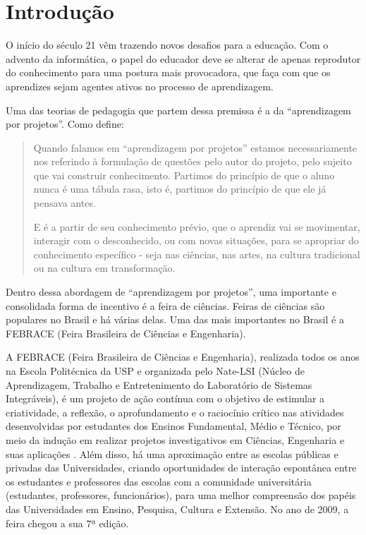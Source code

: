
\chapter{Introdução}

O início do século 21 vêm trazendo novos desafios para a educação. Com o advento da informática, o papel do educador deve se alterar de apenas reprodutor do conhecimento para uma postura mais provocadora, que faça com que os aprendizes sejam agentes ativos no processo de aprendizagem. 

Uma das teorias de pedagogia que partem dessa premissa é a da “aprendizagem por projetos”. Como \cite{fagundes99} define:

\begin{quotation}
    Quando falamos em “aprendizagem por projetos” estamos necessariamente nos referindo à formulação de questões pelo autor do projeto, pelo sujeito que vai construir conhecimento. Partimos do princípio de que o aluno nunca é uma tábula rasa, isto é, partimos do princípio de que ele já pensava antes.

    E é a partir de seu conhecimento prévio, que o aprendiz vai se movimentar, interagir com o desconhecido, ou com novas situações, para se apropriar do conhecimento específico - seja nas ciências, nas artes, na cultura tradicional ou na cultura em transformação.
\end{quotation}

Dentro dessa abordagem de “aprendizagem por projetos”, uma importante e consolidada forma de incentivo é a feira de ciências. Feiras de ciências são populares no Brasil e há várias delas. Uma das mais importantes no Brasil é a FEBRACE (Feira Brasileira de Ciências e Engenharia).

A FEBRACE (Feira Brasileira de Ciências e Engenharia), realizada todos os anos na Escola Politécnica da USP e organizada pelo Nate-LSI (Núcleo de Aprendizagem, Trabalho e Entretenimento do Laboratório de Sistemas Integráveis), é um projeto de ação contínua com o objetivo de estimular a criatividade, a reflexão, o aprofundamento e o raciocínio crítico nas atividades desenvolvidas por estudantes dos Ensinos Fundamental, Médio e Técnico, por meio da indução em realizar projetos investigativos em Ciências, Engenharia e suas aplicações \cite{lopes07}. Além disso, há uma aproximação entre as escolas públicas e privadas das Universidades, criando oportunidades de interação espontânea entre os estudantes e professores das escolas com a comunidade universitária (estudantes, professores, funcionários), para uma melhor compreensão dos papéis das Universidades em Ensino, Pesquisa, Cultura e Extensão. No ano de 2009, a feira chegou a sua 7ª edição.

